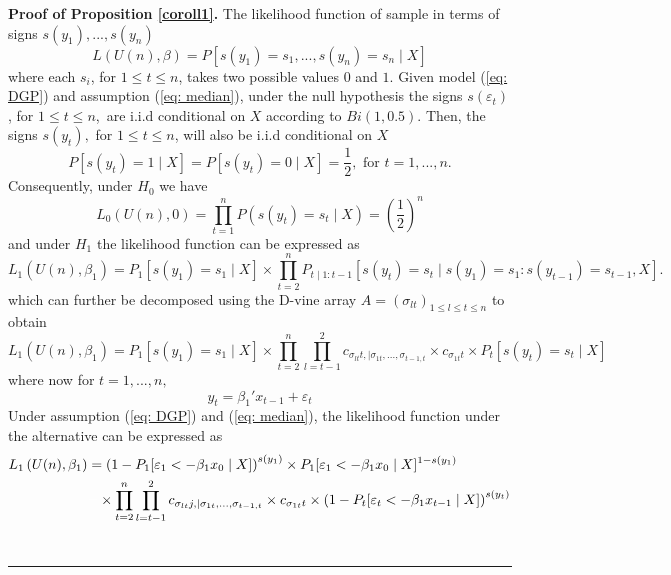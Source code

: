 \documentclass[harvard,11pt]{article}
\newenvironment{proof}[1][Proof]{\textbf{#1.} }{\  \rule{0.5em}{0.5em}}
\begin{document}
\begin{proof}[Proof of Proposition \protect\ref{coroll1}]
The likelihood function of sample in terms of signs $s(y_{1}),...,s(y_{n})$%
\begin{equation*}
L\left( U(n),\beta \right) =P\left[s(y_{1})=s_{1},...,s(y_{n})=s_{n}\mid X\right] 
\end{equation*}%
where each $s_{i}$, for $1\leq t\leq n$, takes two possible values $0$ and $%
1 $. Given model (\ref{eq: DGP}) and assumption (\ref{eq: median}), under the null hypothesis the signs $s(\varepsilon_{t})$, for $1\leq t\leq n$,\ are i.i.d conditional on $X$ according to $Bi(1,0.5)$. Then, the signs $s(y_{t}),$ for $1\leq t\leq n$, will also be i.i.d conditional on $X$
\begin{equation*}
P\left[ s(y_{t})=1\mid X\right] =P\left[ s(y_{t})=0\mid X\right] =%
\frac{1}{2},\text{ for }t=1,...,n.
\end{equation*}%
Consequently, under $H_0$ we have
\begin{equation*}
L_{0}\left( U(n),0\right) =\prod\limits_{t=1}^{n}
P\left( s(y_{t})=s_{t}\mid X\right) =\left( \frac{1}{2}\right) ^{n}
\end{equation*}%
and under $H_1$ the likelihood function can be expressed as 
\[
L_1\left( U(n),\beta_1 \right) =P_1[s(y_1)=s_1\mid X]\times\prod\limits_{t=2}^{n}P_{t\mid 1:{t-1}}[s(y_t)=s_t\mid s(y_1)=s_1:s(y_{t-1})=s_{t-1},X].
\]
which can further be decomposed using the D-vine array $A=(\sigma_{lt})_{1\leq l\leq t\leq n}$ to obtain
\[
L_1\left( U(n),\beta_1 \right) =P_1[s(y_1)=s_1\mid X]\times\prod\limits_{t=2}^{n}\prod\limits_{l=t-1}^{2} c_{\sigma_{lt}t,\mid \sigma_{1t},...,\sigma_{t-1,t}}\times c_{\sigma_{1t}t}\times P_t[s(y_t)=s_t\mid X]
\]
where now for $t=1,...,n,$%
\begin{equation*}
y_{t}=\beta_1'x_{t-1}+\varepsilon_{t}
\end{equation*}%
Under assumption (\ref{eq: DGP}) and (\ref{eq: median}), the likelihood function under the alternative can be expressed as 
\begingroup
\allowdisplaybreaks
\begin{align*}
L_1\left( U(n),\beta_1 \right)& =\left(1-P_1[\varepsilon_1< -\beta_1 x_0\mid X]\right)^{s(y_1)}\times P_1[\varepsilon_1 <- \beta_1 x_0\mid X]^{1-s(y_1)}\\
&\textcolor{white}{=}\times\prod\limits_{t=2}^{n}\prod\limits_{l=t-1}^{2} c_{\sigma_{lt}j,\mid \sigma_{1t},...,\sigma_{t-1,t}}\times c_{\sigma_{1t}t}
\times \left(1-P_t[\varepsilon_t< -\beta_1 x_{t-1}\mid X]\right)^{s(y_t)}\\

\end{align*}
\end{proof}
\end{document}
